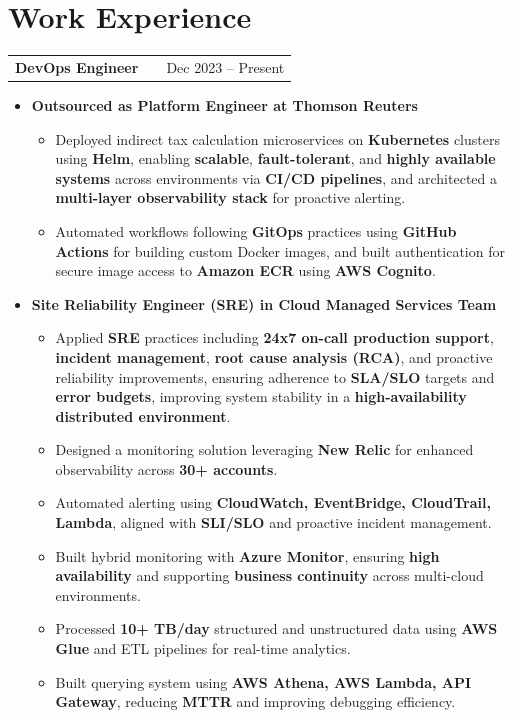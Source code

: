 \documentclass[a4paper,10.999999pt]{article}
\makeatletter
\newenvironment{joblong}[2]
        {
        \begin{tabularx}{\linewidth}{@{}l X r@{}}
        \textbf{#1} & \hfill &  #2 \\[-1pt]
        \end{tabularx}
        \vspace{-3.2pt}
        \begin{minipage}[t]{\linewidth}
        \begin{itemize}[nosep, after=\strut, leftmargin=0.5em, itemsep=1pt, label=\raisebox{0.2ex}{\tiny$\circ$}]
        }
        {
        \end{itemize}
        \end{minipage}
        \vspace{-3.2pt}
        }
\makeatother
\begin{document}

    \section{Work Experience}

    \begin{joblong}{DevOps Engineer}{Dec 2023 -- Present}
    Intuitive.Cloud
    \item \textbf{Outsourced as Platform Engineer at Thomson Reuters}
    \begin{itemize}
    \item Deployed indirect tax calculation microservices on \textbf{Kubernetes} clusters using \textbf{Helm}, enabling \textbf{scalable}, \textbf{fault-tolerant}, and \textbf{highly available systems} across environments via \textbf{CI/CD pipelines}, and architected a \textbf{multi-layer observability stack} for proactive alerting.
    \item Automated workflows following \textbf{GitOps} practices using \textbf{GitHub Actions} for building custom Docker images, and built authentication for secure image access to \textbf{Amazon ECR} using \textbf{AWS Cognito}.
    \end{itemize}
    \vspace{5pt}

    \item \textbf{Site Reliability Engineer (SRE) in Cloud Managed Services Team}
    \begin{itemize}

    \item Applied \textbf{SRE} practices including \textbf{24x7 on-call production support}, \textbf{incident management}, \textbf{root cause analysis (RCA)}, and proactive reliability improvements, ensuring adherence to \textbf{SLA/SLO} targets and \textbf{error budgets}, improving system stability in a \textbf{high-availability distributed environment}.
    \item Designed a monitoring solution leveraging \textbf{New Relic} for enhanced observability across \textbf{30+ accounts}.
    \item Automated alerting using \textbf{CloudWatch, EventBridge, CloudTrail, Lambda}, aligned with \textbf{SLI/SLO} and proactive incident management.

    \item Built hybrid monitoring with \textbf{Azure Monitor}, ensuring \textbf{high availability} and supporting \textbf{business continuity} across multi-cloud environments.
    \item Processed \textbf{10+ TB/day} structured and unstructured data using \textbf{AWS Glue} and ETL pipelines for real-time analytics.
    \item Built querying system using \textbf{AWS Athena, AWS Lambda, API Gateway}, reducing \textbf{MTTR} and improving debugging efficiency.



\end{itemize}
\end{joblong}
\end{document}
